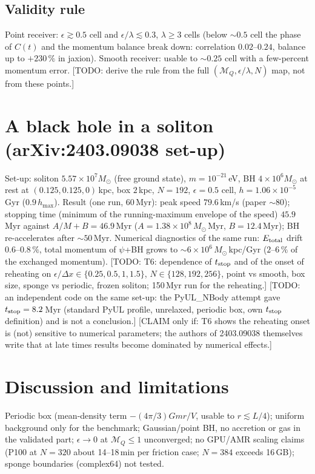 \documentclass[11pt]{article}
\newcommand{\todo}[1]{{\color{red}[TODO: #1]}}
\newcommand{\claim}[1]{{\color{blue}[CLAIM only if: #1]}}
\newcommand{\MQ}{\mathcal{M}_Q}
\begin{document}
\subsection{Validity rule}
Point receiver: $\epsilon\gtrsim0.5$ cell and $\epsilon/\lambda\lesssim0.3$, $\lambda\ge3$ cells (below $\sim0.5$ cell the phase of $C(t)$ and the momentum balance break down: correlation $0.02$--$0.24$, balance up to $+230\,\%$ in jaxion).
Smooth receiver: usable to $\sim0.25$ cell with a few-percent momentum error. \todo{derive the rule from the full $(\MQ,\epsilon/\lambda,N)$ map, not from these points.}

\section{A black hole in a soliton (arXiv:2403.09038 set-up)}
Set-up: soliton $5.57\times10^7M_\odot$ (free ground state), $m=10^{-21}$\,eV, BH $4\times10^6M_\odot$ at rest at $(0.125,0.125,0)$\,kpc, box $2$\,kpc, $N=192$, $\epsilon=0.5$ cell, $h=1.06\times10^{-5}$\,Gyr ($0.9\,h_{\max}$).
Result (one run, 60\,Myr): peak speed $79.6$\,km/s (paper $\sim80$); stopping time (minimum of the running-maximum envelope of the speed) $45.9$\,Myr against $A/M+B=46.9$\,Myr ($A=1.38\times10^8\,M_\odot$\,Myr, $B=12.4$\,Myr); BH re-accelerates after $\sim50$\,Myr.
Numerical diagnostics of the same run: $E_{\rm total}$ drift $0.6$--$0.8\,\%$, total momentum of $\psi$+BH grows to $\sim6\times10^6\,M_\odot$\,kpc/Gyr ($2$--$6\,\%$ of the exchanged momentum).
\todo{T6: dependence of $t_{\rm stop}$ and of the onset of reheating on $\epsilon/\Delta x\in\{0.25,0.5,1,1.5\}$, $N\in\{128,192,256\}$, point vs smooth, box size, sponge vs periodic, frozen soliton; 150\,Myr run for the reheating.}
\todo{an independent code on the same set-up: the PyUL\_NBody attempt gave $t_{\rm stop}=8.2$\,Myr (standard PyUL profile, unrelaxed, periodic box, own $t_{\rm stop}$ definition) and is not a conclusion.}
\claim{T6 shows the reheating onset is (not) sensitive to numerical parameters; the authors of 2403.09038 themselves write that at late times results become dominated by numerical effects.}

\section{Discussion and limitations}
Periodic box (mean-density term $-(4\pi/3)Gmr/V$, usable to $r\lesssim L/4$); uniform background only for the benchmark; Gaussian/point BH, no accretion or gas in the validated part; $\epsilon\to0$ at $\MQ\le1$ unconverged;
no GPU/AMR scaling claims (P100 at $N=320$ about 14--18\,min per friction case; $N=384$ exceeds 16\,GB); sponge boundaries (complex64) not tested.
\end{document}
